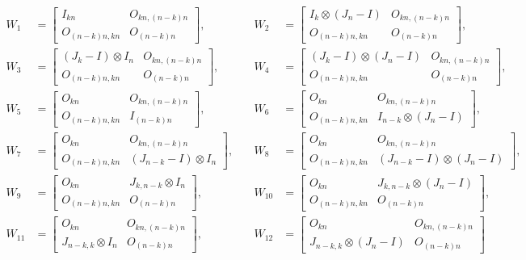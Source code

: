 \[
\begin{aligned}
W_1 &= 
\begin{bmatrix}
I_{kn} & O_{kn, (n-k)n} \\
O_{(n-k)n,kn} & O_{(n-k)n}
\end{bmatrix},
& \quad
W_2 &= 
\begin{bmatrix}
I_k \otimes (J_n - I) & O_{kn, (n-k)n} \\
O_{(n-k)n,kn} & O_{(n-k)n}
\end{bmatrix}, \\[1em]
W_3 &= 
\begin{bmatrix}
(J_k - I) \otimes I_n & O_{kn, (n-k)n} \\
O_{(n-k)n,kn} & O_{(n-k)n}
\end{bmatrix},
& \quad
W_4 &= 
\begin{bmatrix}
(J_k - I) \otimes (J_n - I) & O_{kn, (n-k)n} \\
O_{(n-k)n,kn} & O_{(n-k)n}
\end{bmatrix}, \\[1em]
W_5 &= 
\begin{bmatrix}
O_{kn} & O_{kn, (n-k)n} \\
O_{(n-k)n,kn} & I_{(n - k)n}
\end{bmatrix},
& \quad
W_6 &= 
\begin{bmatrix}
O_{kn} & O_{kn, (n-k)n} \\
O_{(n-k)n,kn} & I_{n - k} \otimes (J_n - I)
\end{bmatrix}, \\[1em]
W_7 &= 
\begin{bmatrix}
O_{kn} & O_{kn, (n-k)n} \\
O_{(n-k)n,kn} & (J_{n - k} - I) \otimes I_n
\end{bmatrix},
& \quad
W_8 &= 
\begin{bmatrix}
O_{kn} & O_{kn, (n-k)n} \\
O_{(n-k)n,kn} & (J_{n - k} - I) \otimes (J_n - I)
\end{bmatrix}, \\[1em]
W_9 &= 
\begin{bmatrix}
O_{kn} & J_{k,n-k} \otimes I_n \\
O_{(n-k)n,kn} & O_{(n-k)n}
\end{bmatrix},
& \quad
W_{10} &=
\begin{bmatrix}
O_{kn} & J_{k,n-k} \otimes (J_n - I) \\
O_{(n-k)n,kn} & O_{(n-k)n}
\end{bmatrix}, \\[1em]
W_{11} &=
\begin{bmatrix}
O_{kn} & O_{kn, (n-k)n} \\
J_{n-k, k}\otimes I_n & O_{(n-k)n}
\end{bmatrix}, 
& \quad
W_{12} &=
\begin{bmatrix}
O_{kn} & O_{kn, (n-k)n} \\
J_{n-k, k}\otimes (J_n-I) & O_{(n-k)n}
\end{bmatrix}
\end{aligned}
\]
